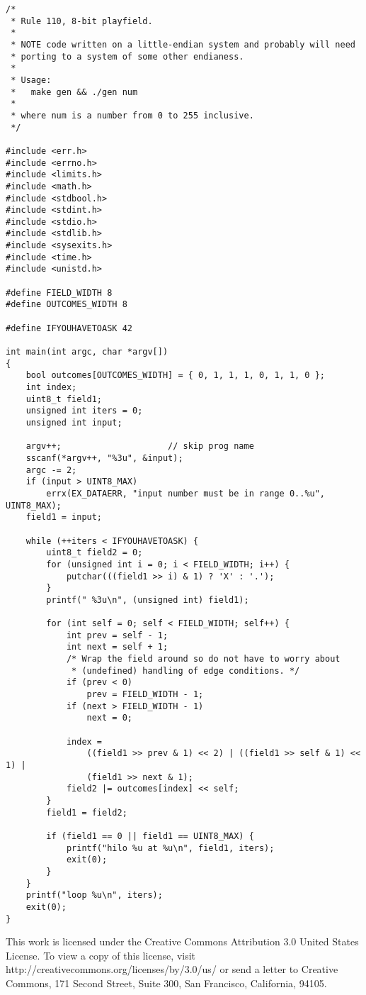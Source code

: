 \documentclass[a4paper,10pt,twoside,onecolumn,openany,final]{memoir}
\begin{document}
\begin{verbatim}
/*
 * Rule 110, 8-bit playfield.
 *
 * NOTE code written on a little-endian system and probably will need
 * porting to a system of some other endianess.
 *
 * Usage:
 *   make gen && ./gen num
 *
 * where num is a number from 0 to 255 inclusive.
 */

#include <err.h>
#include <errno.h>
#include <limits.h>
#include <math.h>
#include <stdbool.h>
#include <stdint.h>
#include <stdio.h>
#include <stdlib.h>
#include <sysexits.h>
#include <time.h>
#include <unistd.h>

#define FIELD_WIDTH 8
#define OUTCOMES_WIDTH 8

#define IFYOUHAVETOASK 42

int main(int argc, char *argv[])
{
    bool outcomes[OUTCOMES_WIDTH] = { 0, 1, 1, 1, 0, 1, 1, 0 };
    int index;
    uint8_t field1;
    unsigned int iters = 0;
    unsigned int input;

    argv++;                     // skip prog name
    sscanf(*argv++, "%3u", &input);
    argc -= 2;
    if (input > UINT8_MAX)
        errx(EX_DATAERR, "input number must be in range 0..%u", UINT8_MAX);
    field1 = input;

    while (++iters < IFYOUHAVETOASK) {
        uint8_t field2 = 0;
        for (unsigned int i = 0; i < FIELD_WIDTH; i++) {
            putchar(((field1 >> i) & 1) ? 'X' : '.');
        }
        printf(" %3u\n", (unsigned int) field1);

        for (int self = 0; self < FIELD_WIDTH; self++) {
            int prev = self - 1;
            int next = self + 1;
            /* Wrap the field around so do not have to worry about
             * (undefined) handling of edge conditions. */
            if (prev < 0)
                prev = FIELD_WIDTH - 1;
            if (next > FIELD_WIDTH - 1)
                next = 0;

            index =
                ((field1 >> prev & 1) << 2) | ((field1 >> self & 1) << 1) |
                (field1 >> next & 1);
            field2 |= outcomes[index] << self;
        }
        field1 = field2;

        if (field1 == 0 || field1 == UINT8_MAX) {
            printf("hilo %u at %u\n", field1, iters);
            exit(0);
        }
    }
    printf("loop %u\n", iters);
    exit(0);
}
\end{verbatim}

\clearpage
This work is licensed under the Creative Commons Attribution 3.0 United States License. To view a copy of this license, visit http://creativecommons.org/licenses/by/3.0/us/ or send a letter to Creative Commons, 171 Second Street, Suite 300, San Francisco, California, 94105.
\end{document}
